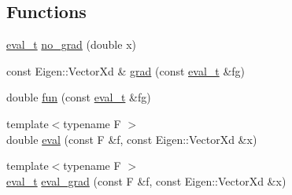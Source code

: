\subsection*{Functions}
\begin{DoxyCompactItemize}
\item 
\hyperlink{group__opt__tools_ga7fc87080ebf563d050fc547d25528ef0}{eval\+\_\+t} \hyperlink{group__opt__tools_ga38e53ccac21f452bd31e9b239985d456}{no\+\_\+grad} (double x)
\item 
const Eigen\+::\+Vector\+Xd \& \hyperlink{group__opt__tools_gaf28d9af930b2993024ab497b285e0521}{grad} (const \hyperlink{group__opt__tools_ga7fc87080ebf563d050fc547d25528ef0}{eval\+\_\+t} \&fg)
\item 
double \hyperlink{group__opt__tools_ga68ad00d7501bc26a2a0990bac762393e}{fun} (const \hyperlink{group__opt__tools_ga7fc87080ebf563d050fc547d25528ef0}{eval\+\_\+t} \&fg)
\item 
{\footnotesize template$<$typename F $>$ }\\double \hyperlink{group__opt__tools_ga698d932ac52cab812742b1300f875372}{eval} (const F \&f, const Eigen\+::\+Vector\+Xd \&x)
\item 
{\footnotesize template$<$typename F $>$ }\\\hyperlink{group__opt__tools_ga7fc87080ebf563d050fc547d25528ef0}{eval\+\_\+t} \hyperlink{group__opt__tools_ga6abbcdf8d83abca89802881d883fb9e3}{eval\+\_\+grad} (const F \&f, const Eigen\+::\+Vector\+Xd \&x)
\end{DoxyCompactItemize}
